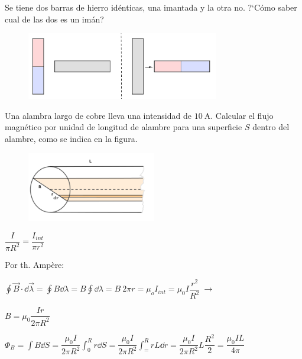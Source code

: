 \begin{prob}
Se tiene dos barras de hierro idénticas, una imantada y la otra no. ?`Cómo saber cual de las dos es un imán?	
\end{prob}

\begin{figure}[H]
	\centering
	\includegraphics[width=0.75\textwidth]{imagenes/imagenes27/T27IM12.png}
\end{figure}

\vspace{20mm} %


\begin{prob}
\begin{multicols}{2}
Una alambra largo de cobre lleva una intensidad de $10\ \mathrm{A}$. Calcular el flujo magnético por unidad de longitud de alambre para una superficie $S$ dentro del alambre, como se indica en la figura.	
\begin{figure}[H]
	\centering
	\includegraphics[width=0.5\textwidth]{imagenes/imagenes27/T27IM13.png}
\end{figure}
\end{multicols}
\end{prob}

$\dfrac I{\pi R^2}=\dfrac{I_{int}}{\pi r^2}$

Por th. Ampère: 

$\displaystyle \oint \vec B \cdot \dd \vec \lambda=\oint B \dd \lambda =B\oint \dd \lambda = B\ 2\pi r =\mu_o I_{int}=\mu_0 I \dfrac {r^2}{R^2} \ \to $ 

$B=\mu_0 \dfrac{Ir}{2\pi R^2}$

$\displaystyle \Phi_B=\int B \dd S = \dfrac{\mu_0 I}{2\pi R^2} \int_0^R
r \dd S =  \dfrac{\mu_0 I}{2\pi R^2} \int_=^R r L \dd r =  \dfrac{\mu_0 I}{2\pi R^2} L \dfrac {R^2}{2} =   \dfrac{\mu_0 I L}{4\pi}$

